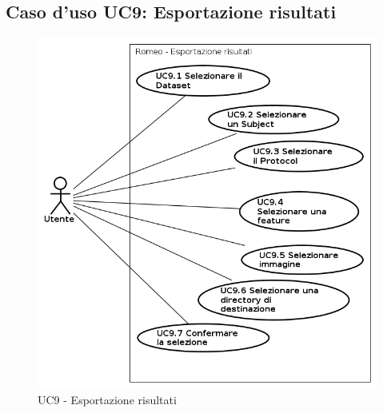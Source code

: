 \subsection{Caso d'uso UC9: Esportazione risultati}
\begin{figure}[!h]
\begin{center}
\includegraphics[scale=0.6]{./img/Use_Case/UC9}
\caption{UC9 - Esportazione risultati}
\end{center}
\end{figure}

